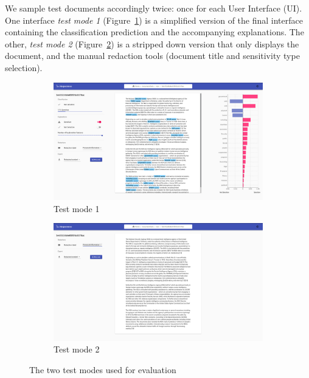 \documentclass[\version]{l4proj}
\begin{document}
We sample test documents accordingly twice: once for each User Interface (UI).
One interface \textit{test mode 1} (Figure~\ref{fig:test-mode-1}) is a simplified version of the final interface containing the classification prediction and the accompanying explanations.
The other, \textit{test mode 2} (Figure~\ref{fig:test-mode-2}) is a stripped down version that only displays the document, and the manual redaction tools (document title and sensitivity type selection).

\begin{figure}[H]
    \centering
    \begin{subfigure}[c]{0.49\textwidth}
        \centering
        \includegraphics[width=\textwidth]{images/ui_test_mode_1.png}
        \caption{Test mode 1}\label{fig:test-mode-1}
    \end{subfigure}
    \begin{subfigure}[c]{0.49\textwidth}
        \centering
        \includegraphics[width=\textwidth]{images/ui_test_mode_2.png}
        \caption{Test mode 2}\label{fig:test-mode-2}
    \end{subfigure}
    \caption{The two test modes used for evaluation}\label{fig:test-modes}
\end{figure}
\end{document}
